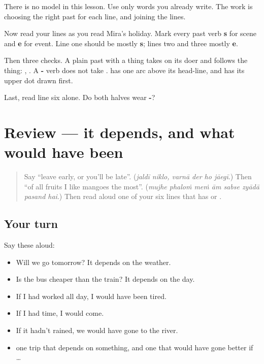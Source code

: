 There is no model in this lesson. Use only words you already write. The work is choosing the right past for each line, and joining the lines.

\begin{tcolorbox}[breakable,colback=teal!4,colframe=teal!35!black,title={Before you move on}]
Now read your lines as you read Mira's holiday. Mark every past verb \textbf{s} for scene and \textbf{e} for event. Line one should be mostly \textbf{s}; lines two and three mostly \textbf{e}.

Then three checks. A plain past with a thing takes \textbf{} on its doer and follows the thing: \textbf{  }, \textbf{  }. A \textbf{- } verb does not take \textbf{}. \textbf{} has one arc above its head-line, and \textbf{} has its upper dot drawn first.

Last, read line six alone. Do both halves wear \textbf{-}?
\end{tcolorbox}
\section[(review)]{Review — it depends, and what would have been}

\label{lesson:HI-R287-depends-and-would}



\begin{quote}
Say \textquotedblleft{}leave early, or you'll be late\textquotedblright{}. (\emph{jaldī niklo, varnā der ho jāegī}.) Then \textquotedblleft{}of all fruits I like mangoes the most\textquotedblright{}. (\emph{mujhe phaloṁ meṁ ām sabse zyādā pasand hai}.) Then read aloud one of your six lines that has \textbf{} or \textbf{}.
\end{quote}

\subsection*{Your turn}
Say these aloud:

\begin{itemize}
\raggedright
  \item Will we go tomorrow? It depends on the weather.
  \item Is the bus cheaper than the train? It depends on the day.
  \item If I had worked all day, I would have been tired.
  \item If I had time, I would come.
  \item If it hadn't rained, we would have gone to the river.
  \item one trip that depends on something, and one that would have gone better if …
\end{itemize}

